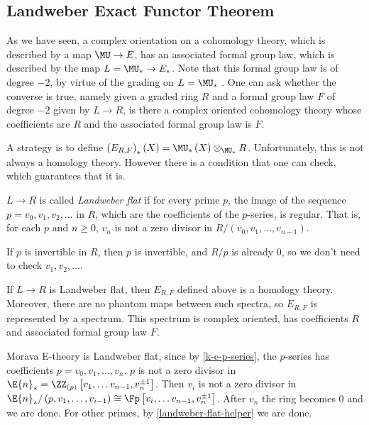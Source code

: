


\subsection{Landweber Exact Functor Theorem}

As we have seen, a complex orientation on a cohomology theory, which is described by a map $\MU \to E$, has an associated formal group law, which is described by the map $L = \MU_* \to E_*$.
Note that this formal group law is of degree $-2$, by virtue of the grading on $L = \MU_*$ .
One can ask whether the converse is true, namely given a graded ring $R$ and a formal group law $F$ of degree $-2$ given by $L \to R$, is there a complex oriented cohomology theory whose coefficients are $R$ and the associated formal group law is $F$.

A strategy is to define $\left(E_{R,F}\right)_*\left(X\right) = \MU_*\left(X\right) \otimes_{\MU_*} R$.
Unfortunately, this is not always a homology theory.
However there is a condition that one can check, which guarantees that it is.

\begin{definition}
	$L \to R$ is called \emph{Landweber flat} if for every prime $p$, the image of the sequence $p = v_0, v_1, v_2, \dotsc$ in $R$, which are the coefficients of the $p$-series, is regular.
	That is, for each $p$ and $n \geq 0$, $v_n$ is not a zero divisor in $R/\left(v_0, v_1, \dotsc, v_{n-1}\right)$.
\end{definition}

\begin{remark}\label{landweber-flat-helper}
	If $p$ is invertible in $R$, then $p$ is invertible, and $R/p$ is already $0$, so we don't need to check $v_1, v_2, \dotsc$.
\end{remark}

\begin{theorem}\label{LEFT}
	If $L \to R$ is Landweber flat, then $E_{R,F}$ defined above is a homology theory.
	Moreover, there are no phantom maps between such spectra, so $E_{R,F}$ is represented by a spectrum.
	This spectrum is complex oriented, has coefficients $R$ and associated formal group law $F$.
\end{theorem}

\begin{example}
	Morava E-theory is Landweber flat, since by \ref{k-e-p-series}, the $p$-series has coefficients $p = v_0, v_1, \dotsc, v_n$.
	$p$ is not a zero divisor in $\E{n}_* = \ZZ_{\left(p\right)}\left[v_1, \dotsc v_{n-1}, v_n^{\pm 1}\right]$.
	Then $v_i$ is not a zero divisor in $\E{n}_*/\left(p, v_1, \dotsc, v_{i-1}\right) \cong \Fp\left[v_i, \dotsc v_{n-1}, v_n^{\pm 1}\right]$.
	After $v_n$ the ring becomes $0$ and we are done.
	For other primes, by \ref{landweber-flat-helper} we are done.
\end{example}

